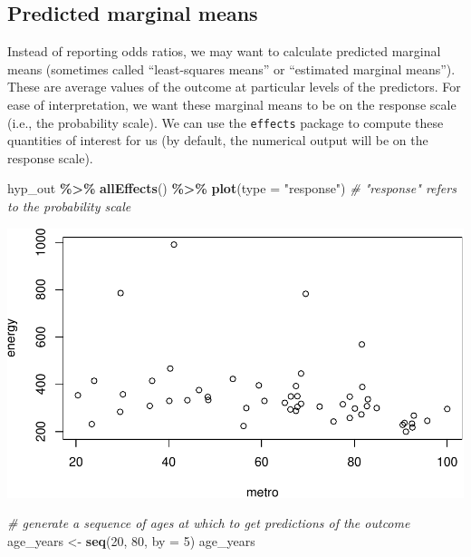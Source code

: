 \documentclass[
]{book}
\newenvironment{Shaded}{\begin{snugshade}}{\end{snugshade}}
\newcommand{\CommentTok}[1]{\textcolor[rgb]{0.56,0.35,0.01}{\textit{#1}}}
\newcommand{\DataTypeTok}[1]{\textcolor[rgb]{0.13,0.29,0.53}{#1}}
\newcommand{\DecValTok}[1]{\textcolor[rgb]{0.00,0.00,0.81}{#1}}
\newcommand{\KeywordTok}[1]{\textcolor[rgb]{0.13,0.29,0.53}{\textbf{#1}}}
\newcommand{\NormalTok}[1]{#1}
\newcommand{\OperatorTok}[1]{\textcolor[rgb]{0.81,0.36,0.00}{\textbf{#1}}}
\newcommand{\StringTok}[1]{\textcolor[rgb]{0.31,0.60,0.02}{#1}}
\begin{document}
\hypertarget{predicted-marginal-means}{%
\subsection{Predicted marginal means}\label{predicted-marginal-means}}

Instead of reporting odds ratios, we may want to calculate predicted marginal means (sometimes called ``least-squares means'' or ``estimated marginal means''). These are average values of the outcome at particular levels of the predictors. For ease of interpretation, we want these marginal means to be on the response scale (i.e., the probability scale). We can use the \texttt{effects} package to compute these quantities of interest for us (by default, the numerical output will be on the response scale).

\begin{Shaded}
\begin{Highlighting}[]
\NormalTok{  hyp\_out }\OperatorTok{\%\textgreater{}\%}\StringTok{ }
\StringTok{      }\KeywordTok{allEffects}\NormalTok{() }\OperatorTok{\%\textgreater{}\%}
\StringTok{      }\KeywordTok{plot}\NormalTok{(}\DataTypeTok{type =} \StringTok{"response"}\NormalTok{) }\CommentTok{\# "response" refers to the probability scale}
\end{Highlighting}
\end{Shaded}

\includegraphics{R/Rmodels/figures/unnamed-chunk-129-1.pdf}

\begin{Shaded}
\begin{Highlighting}[]
  \CommentTok{\# generate a sequence of ages at which to get predictions of the outcome}
\NormalTok{  age\_years \textless{}{-}}\StringTok{ }\KeywordTok{seq}\NormalTok{(}\DecValTok{20}\NormalTok{, }\DecValTok{80}\NormalTok{, }\DataTypeTok{by =} \DecValTok{5}\NormalTok{)}
\NormalTok{  age\_years}
\end{Highlighting}
\end{Shaded}
\end{document}
